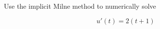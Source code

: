 Use the implicit Milne method to numerically solve

$$
u'(t) = 2(t + 1)
$$

\begin{solution}\ \\\\
\ \\
\end{solution}